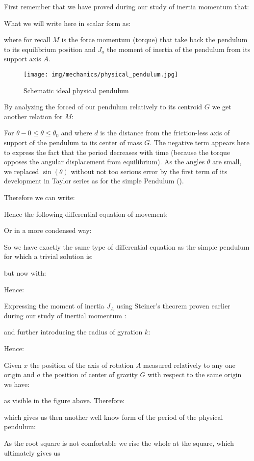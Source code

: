 	First remember that we have proved during our study of inertia momentum that:	
	
	What we will write here in scalar form as:
	
	where for recall $M$ is the force momentum (torque) that take back the pendulum to its equilibrium position and $J_a$ the moment of inertia of the pendulum from its support axis $A$.
	\begin{figure}[H]
		\centering
		\texttt{[image: img/mechanics/physical\_pendulum.jpg]}
		\caption{Schematic ideal physical pendulum}
	\end{figure}
	By analyzing the forced of our pendulum relatively to its centroid $G$ we get another relation for $M$:
	
	For $\theta-0\leq \theta\leq \theta_0$ and where $d$ is the distance from the friction-less axis of support of the pendulum to its center of mass $G$. The negative term appears here to express the fact that the period decreases with time (because the torque opposes the angular displacement from equilibrium). As the angles $\theta$ are small, we replaced $\sin(\theta)$ without not too serious error by the first term of its development in Taylor series as for the simple Pendulum ().
	
	Therefore we can write:
	
	Hence the following differential equation of movement:
	
	Or in a more condensed way:
	
	So we have exactly the same type of differential equation as the simple pendulum for which a trivial solution is:
	
	but now with:
	
	Hence:
	
	Expressing the moment of inertia $J_A$ using Steiner's theorem proven earlier during our study of inertial momentum :
	
	and further introducing the radius of gyration $k$:
	
	Hence:
	
	Given $x$ the position of the axis of rotation $A$ measured relatively to any one origin and $a$ the position of center of gravity $G$ with respect to the same origin we have:
	
	as visible in the figure above.
	Therefore:
	
	which gives us then another well know form of the period of the physical pendulum:
	
	As the root square is not comfortable we rise the whole at the square, which ultimately gives us
	
